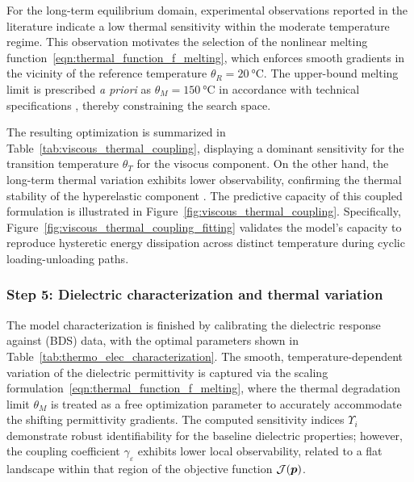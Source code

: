 For the long-term equilibrium domain, experimental observations reported in the literature \cite{Dippel2015, Liao_Mokarram2020} indicate a low thermal sensitivity within the moderate temperature regime. This observation motivates the selection of the nonlinear melting function~\eqref{eqn:thermal_function_f_melting}, which enforces smooth gradients in the vicinity of the reference temperature $\theta_R = \SI{20}{\celsius}$. The upper-bound melting limit is prescribed \textit{a priori} as $\theta_M = \SI{150}{\celsius}$ in accordance with technical specifications \cite{3MVHB4910}, thereby constraining the search space.

The resulting optimization is summarized in Table~\ref{tab:viscous_thermal_coupling}, displaying a dominant sensitivity for the transition temperature $\theta_T$ for the visocus component. On the other hand, the long-term thermal variation exhibits lower observability, confirming the thermal stability of the hyperelastic component \cite{Liao_Mokarram2020}.
The predictive capacity of this coupled formulation is illustrated in Figure~\ref{fig:viscous_thermal_coupling}. Specifically, Figure~\ref{fig:viscous_thermal_coupling_fitting} validates the model's capacity to reproduce hysteretic energy dissipation across distinct temperature during cyclic loading-unloading paths.


\subsubsection{Step 5: Dielectric characterization and thermal variation}

The model characterization is finished by calibrating the dielectric response against (BDS) data, with the optimal parameters shown in Table~\ref{tab:thermo_elec_characterization}. The smooth, temperature-dependent variation of the dielectric permittivity is captured via the scaling formulation~\eqref{eqn:thermal_function_f_melting}, where the thermal degradation limit $\theta_M$ is treated as a free optimization parameter to accurately accommodate the shifting permittivity gradients. The computed sensitivity indices $\Upsilon_i$ demonstrate robust identifiability for the baseline dielectric properties; however, the coupling coefficient $\gamma_\varepsilon$ exhibits lower local observability, related to a flat landscape within that region of the objective function $\mathcal{J}(\boldsymbol{p})$.

